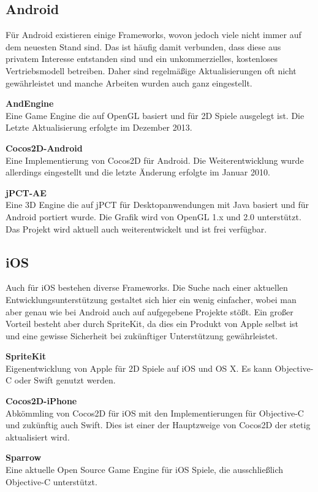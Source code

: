 \subsection{Android}
Für Android existieren einige Frameworks, wovon jedoch viele nicht immer auf dem neuesten Stand sind. Das ist häufig damit verbunden, dass diese aus privatem Interesse entstanden sind und ein unkommerzielles, kostenloses Vertriebsmodell betreiben. Daher sind regelmäßige Aktualisierungen oft nicht gewährleistet und manche Arbeiten wurden auch ganz eingestellt.

\medskip
\textbf{AndEngine}\\
Eine Game Engine die auf OpenGL basiert und für 2D Spiele ausgelegt ist.
Die Letzte Aktualisierung erfolgte im Dezember 2013.

\medskip
\textbf{Cocos2D-Android}\\
Eine Implementierung von Cocos2D für Android. Die Weiterentwicklung wurde allerdings eingestellt und die letzte Änderung erfolgte im Januar 2010.

\medskip
\textbf{jPCT-AE}\\
Eine 3D Engine die auf jPCT für Desktopanwendungen mit Java basiert und für Android portiert wurde. Die Grafik wird von OpenGL 1.x und 2.0 unterstützt. Das Projekt wird aktuell auch weiterentwickelt und ist frei verfügbar.

\subsection{iOS}
Auch für iOS bestehen diverse Frameworks. Die Suche nach einer aktuellen Entwicklungsunterstützung gestaltet sich hier ein wenig einfacher, wobei man aber genau wie bei Android auch auf aufgegebene Projekte stößt. Ein großer Vorteil besteht aber durch SpriteKit, da dies ein Produkt von Apple selbst ist und eine gewisse Sicherheit bei zukünftiger Unterstützung gewährleistet.

\medskip
\textbf{SpriteKit}\\
Eigenentwicklung von Apple für 2D Spiele auf iOS und OS X. Es kann Objective-C oder Swift genutzt werden.

\medskip
\textbf{Cocos2D-iPhone}\\
Abkömmling von Cocos2D für iOS mit den Implementierungen für Objective-C und zukünftig auch Swift. Dies ist einer der Hauptzweige von Cocos2D der stetig aktualisiert wird.

\medskip
\textbf{Sparrow}\\
Eine aktuelle Open Source Game Engine für iOS Spiele, die ausschließlich Objective-C unterstützt.

